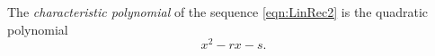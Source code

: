 

\setcounter{section}{1}
\setcounter{subsection}{2}
\setcounter{dfn}{2}

\begin{dfn}
The \emph{characteristic polynomial} of the sequence \eqref{eqn:LinRec2} is the quadratic polynomial
\[
x^2 - rx - s.
\]
\end{dfn}


